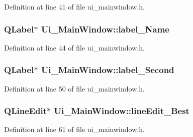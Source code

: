 Definition at line 41 of file ui\+\_\+mainwindow.\+h.

\hypertarget{class_ui___main_window_a8dc29c58515835c76b18f08e22eb02d5}{}
\subsubsection[{label\+\_\+\+Name}]{\setlength{\rightskip}{0pt plus 5cm}Q\+Label$\ast$ Ui\+\_\+\+Main\+Window\+::label\+\_\+\+Name}\label{class_ui___main_window_a8dc29c58515835c76b18f08e22eb02d5}


Definition at line 44 of file ui\+\_\+mainwindow.\+h.

\hypertarget{class_ui___main_window_a3db38c95c92061c3f7205519da154cc5}{}
\subsubsection[{label\+\_\+\+Second}]{\setlength{\rightskip}{0pt plus 5cm}Q\+Label$\ast$ Ui\+\_\+\+Main\+Window\+::label\+\_\+\+Second}\label{class_ui___main_window_a3db38c95c92061c3f7205519da154cc5}


Definition at line 50 of file ui\+\_\+mainwindow.\+h.

\hypertarget{class_ui___main_window_acc9b644029ca428aaa02f51987ab916c}{}
\subsubsection[{line\+Edit\+\_\+\+Best}]{\setlength{\rightskip}{0pt plus 5cm}Q\+Line\+Edit$\ast$ Ui\+\_\+\+Main\+Window\+::line\+Edit\+\_\+\+Best}\label{class_ui___main_window_acc9b644029ca428aaa02f51987ab916c}


Definition at line 61 of file ui\+\_\+mainwindow.\+h.

\hypertarget{class_ui___main_window_a68c792ffc68e4780df20fc5f8b53691b}{}
